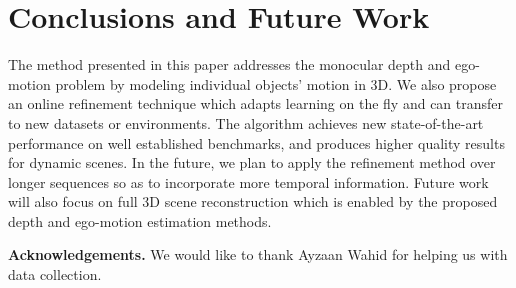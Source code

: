 \documentclass[letterpaper]{article} \usepackage{aaai19}  \usepackage{times}  \usepackage{helvet}  \usepackage{courier}  \usepackage{url}  \usepackage{graphicx}  \frenchspacing
\begin{document}
\section{Conclusions and Future Work}
The method presented in this paper addresses the monocular depth and ego-motion problem by modeling individual objects' motion in 3D. We also propose an online refinement technique which adapts learning on the fly and can transfer to new datasets or environments. The algorithm achieves new state-of-the-art performance on well established benchmarks, and produces higher quality results for dynamic scenes.
In the future, we plan to apply the refinement method over longer sequences so as to incorporate more temporal information. Future work will also focus on full 3D scene reconstruction which is enabled by the proposed depth and ego-motion estimation methods. 

\textbf{Acknowledgements.} We would like to thank Ayzaan Wahid for helping us with data collection.

\fontsize{9.5pt}{10.5pt}
\selectfont




\end{document}
